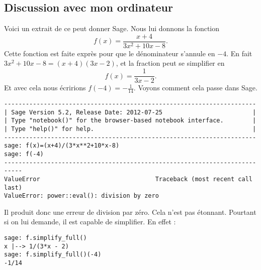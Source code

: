 \subsection{Discussion avec mon ordinateur}

Voici un extrait de ce peut donner Sage. Nous lui donnons la fonction
\begin{equation}    \label{EqyEHTBZ}
    f(x)=\frac{ x+4 }{ 3x^2+10x-8 }.
\end{equation}
Cette fonction est faite exprès pour que le dénominateur s'annule en \( -4\). En fait \( 3x^2+10x-8=(x+4)(3x-2)\), et la fraction peut se simplifier en
\begin{equation}
    f(x)=\frac{1}{ 3x-2 }.
\end{equation}
Et avec cela nous écririons \( f(-4)=-\frac{1}{ 14 }\). Voyons comment cela passe dans Sage.

\begin{verbatim}
----------------------------------------------------------------------
| Sage Version 5.2, Release Date: 2012-07-25                         |
| Type "notebook()" for the browser-based notebook interface.        |
| Type "help()" for help.                                            |
----------------------------------------------------------------------
sage: f(x)=(x+4)/(3*x**2+10*x-8)                                                                                              
sage: f(-4)
---------------------------------------------------------------------------
ValueError                                Traceback (most recent call last)
ValueError: power::eval(): division by zero
\end{verbatim}
Il produit donc une erreur de division par zéro. Cela n'est pas étonnant. Pourtant si on lui demande, il est capable de simplifier. En effet :
\begin{verbatim}
sage: f.simplify_full()                                                                                                        
x |--> 1/(3*x - 2)                                                                                                                                           
sage: f.simplify_full()(-4)                                                                                                                                  
-1/14                                                                                                                                                        
\end{verbatim}

